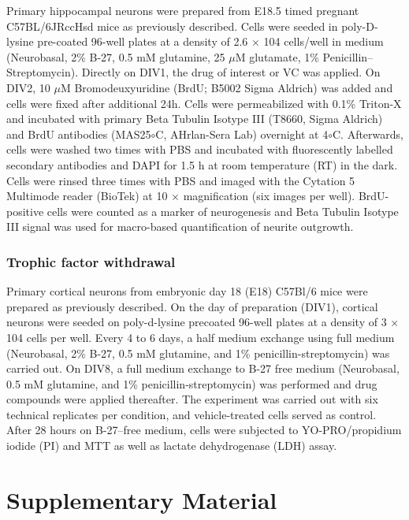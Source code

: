 \documentclass[letterpaper]{article}
\begin{document}
Primary hippocampal neurons were prepared from E18.5 timed pregnant
C57BL/6JRccHsd mice as previously described. Cells were seeded in
poly-D-lysine pre-coated 96-well plates at a density of 2.6 $\times$ 104
cells/well in medium (Neurobasal,
2\% B-27, 0.5 mM glutamine, 25 $\mu$M glutamate,
1\% Penicillin–Streptomycin). Directly on DIV1, the drug of interest or VC was
applied. On DIV2, 10 $\mu$M Bromodeuxyuridine (BrdU; B5002 Sigma Aldrich) was
added and cells were fixed after additional 24h. Cells were permeabilized with
0.1\% Triton-X and incubated with primary Beta Tubulin Isotype III (T8660,
Sigma Aldrich) and BrdU antibodies (MAS25$\circ$C, AHrlan-Sera Lab) overnight
at 4$\circ$C. Afterwards, cells were washed two times with PBS and incubated
with fluorescently labelled secondary antibodies and DAPI for 1.5 h at room
temperature (RT) in the dark. Cells were rinsed three times with PBS and
imaged with the Cytation 5 Multimode reader (BioTek) at 10 $\times$
magnification (six images per well). BrdU-positive cells were counted as a
marker of neurogenesis and Beta Tubulin Isotype III signal was used for
macro-based quantification of neurite outgrowth.

\subsubsection{Trophic factor withdrawal}

Primary cortical neurons from embryonic day 18 (E18) C57Bl/6 mice were
prepared as previously described. On the day of preparation (DIV1), cortical
neurons were seeded on poly-d-lysine precoated 96-well plates at a density of
3 $\times$ 104 cells per well. Every 4 to 6 days, a half medium exchange using full
medium (Neurobasal, 2\% B-27, 0.5 mM glutamine, and 1\% penicillin-streptomycin)
was carried out. On DIV8, a full medium exchange to B-27 free medium
(Neurobasal, 0.5 mM glutamine, and 1\% penicillin-streptomycin) was performed
and drug compounds were applied thereafter. The experiment was carried out
with six technical replicates per condition, and vehicle-treated cells
served as control. After 28 hours on B-27–free medium, cells were subjected to
YO-PRO/propidium iodide (PI) and MTT as well as lactate dehydrogenase (LDH)
assay.




\newpage

\section*{Supplementary Material}
\end{document}

